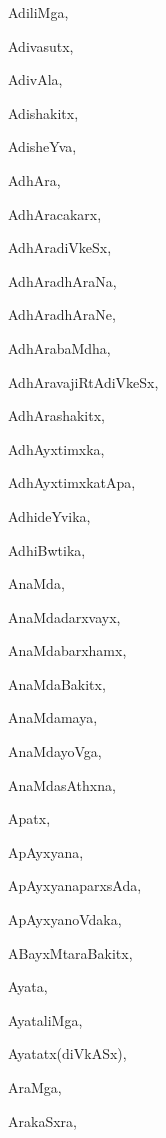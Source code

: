 \begin{multicols}{2}
{AdiliMga}, \pageref{AdiliMga}

{Adivasutx}, \pageref{Adivasutx}

{AdivAla}, \pageref{AdivAla}

{Adishakitx}, \pageref{Adishakitx}

{AdisheYva}, \pageref{AdisheYva}

{AdhAra}, \pageref{AdhAra}

{AdhAracakarx}, \pageref{AdhAracakarx}

{AdhAradiVkeSx}, \pageref{AdhAradiVkeSx}

{AdhAradhAraNa}, \pageref{AdhAradhAraNa}

{AdhAradhAraNe}, \pageref{AdhAradhAraNe}

{AdhArabaMdha}, \pageref{AdhArabaMdha}

{AdhAravajiRtAdiVkeSx}, \pageref{AdhAravajiRtAdiVkeSx}

{AdhArashakitx}, \pageref{AdhArashakitx}

{AdhAyxtimxka}, \pageref{AdhAyxtimxka}

{AdhAyxtimxkatApa}, \pageref{AdhAyxtimxkatApa}

{AdhideYvika}, \pageref{AdhideYvika}

{AdhiBwtika}, \pageref{AdhiBwtika}

{AnaMda}, \pageref{AnaMda}

{AnaMdadarxvayx}, \pageref{AnaMdadarxvayx}

{AnaMdabarxhamx}, \pageref{AnaMdabarxhamx}

{AnaMdaBakitx}, \pageref{AnaMdaBakitx}

{AnaMdamaya}, \pageref{AnaMdamaya}

{AnaMdayoVga}, \pageref{AnaMdayoVga}

{AnaMdasAthxna}, \pageref{AnaMdasAthxna}

{Apatx}, \pageref{Apatx}

{ApAyxyana}, \pageref{ApAyxyana}

{ApAyxyanaparxsAda}, \pageref{ApAyxyanaparxsAda}

{ApAyxyanoVdaka}, \pageref{ApAyxyanoVdaka}

{ABayxMtaraBakitx}, \pageref{ABayxMtaraBakitx}

{Ayata}, \pageref{Ayata}

{AyataliMga}, \pageref{AyataliMga}

{Ayatatx(diVkASx)}, \pageref{Ayatatx(diVkASx)}

{AraMga}, \pageref{AraMga}

{ArakaSxra}, \pageref{Ara(273)kaSxra}


\end{multicols}

